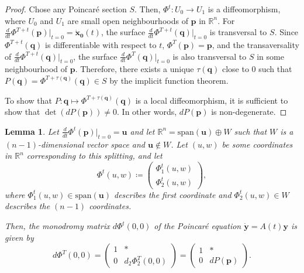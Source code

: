\documentclass[hidelinks,a4paper, 11pt]{article}
\theoremstyle{plain}
\newtheorem{lemma}[theorem]{Lemma}
\theoremstyle{break}
\theoremstyle{plain}
\theoremstyle{definition}
\begin{document}
{

\begin{proof}
	Chose any Poincaré section $S$. Then, $\Phi^t:U_0 \to U_1$ is a diffeomorphism, where $U_0$ and $U_1$ are small open neighbourhoods of $\mathbf p$ in $\mathbb R^n$. For $\frac{d}{dt}\Phi^{T+t}(\mathbf p)\Big \vert_{t = 0} = \mathbf{\dot x_0}(t)$, the surface $\frac{d}{dt}\Phi^{T+t}(\mathbf q)\Big \vert_{t = 0}$ is transversal to $S$. Since $\Phi^{T+t}(\mathbf q)$ is differentiable with respect to $t$, $\Phi^T(\mathbf p) = \mathbf p$, and the transaversality of $\frac{d}{dt}\Phi^{T+t}(\mathbf q)\Big \vert_{t = 0}$, the surface $\frac{d}{dt}\Phi^{T}(\mathbf q)\Big \vert_{t = 0}$ is also transversal to $S$ in some neighbourhood of $\mathbf p$. Therefore, there exists a unique $\tau(\mathbf q)$ close to $0$ such that $P(\mathbf q) = \Phi^{T+\tau(\mathbf q)}(\mathbf q) \in S$ by the implicit function theorem.
	
To show that $P: \mathbf q \mapsto \Phi^{T+\tau(\mathbf q)}(\mathbf q)$ is a local diffeomorphism, it is sufficient to show that $\det(dP(\mathbf p)) \neq 0$. In other words, $dP(\mathbf p)$ is non-degenerate. 
\end{proof}

\begin{lemma}\label{chapter:poincare-map-coordinate-lemma}
	Let $\frac{d}{dt}\Phi^t(\mathbf p) \Big \vert_{t=0} = \mathbf u$ and let $\mathbb R^n = \mathrm{span}(\mathbf u) \oplus W$ such that $W$ is a $(n-1)$-dimensional vector space and $\mathbf u \notin W$. Let $(u, w)$ be some coordinates in $\mathbb R^n$ corresponding to this splitting, and let $$\Phi^t(u,w) \coloneqq \begin{pmatrix}
		\Phi_1^t(u,w) \\ \Phi^t_2(u,w)
	\end{pmatrix},$$ where $	\Phi_1^t(u,w) \in \mathrm{span}(\mathbf u)$ describes the first coordinate and $	\Phi_2^t(u,w) \in W$ describes the $(n-1)$ coordinates. 
	
	Then, the monodromy matrix $d\Phi^t(0,0)$ of the Poincaré equation $\mathbf{\dot y} = A(t)\mathbf y$ is given by
	\[
		d\Phi^T(0,0) = \begin{pmatrix}
		1 & * \\ 0 & d_2\Phi_2^T(0,0)
		\end{pmatrix} = \begin{pmatrix}
		1 & * \\ 0 & dP(\mathbf p)
		\end{pmatrix}.
	\]


\end{lemma}}
\end{document}

